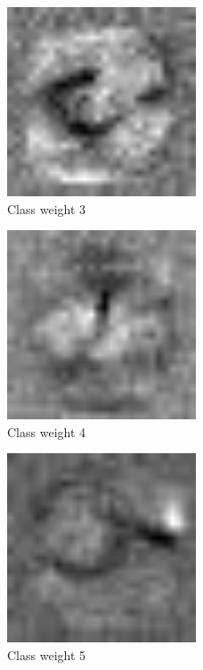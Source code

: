 \begin{figure}[]
    \centering
    \includegraphics[width=0.50\textwidth]{figures/weights/class_3_weight_image.jpg}
    \caption{Class weight 3}
    \label{fig:class_weight_3}
\end{figure}

\begin{figure}[]
    \centering
    \includegraphics[width=0.50\textwidth]{figures/weights/class_4_weight_image.jpg}
    \caption{Class weight 4}
    \label{fig:class_weight_4}
\end{figure}

\begin{figure}[]
    \centering
    \includegraphics[width=0.50\textwidth]{figures/weights/class_5_weight_image.jpg}
    \caption{Class weight 5}
    \label{fig:class_weight_5}
\end{figure}

